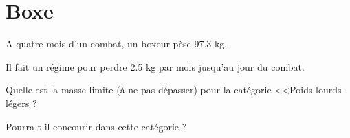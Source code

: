 \section{Boxe}

A quatre mois d'un combat, un boxeur pèse \num{97.3} kg.

Il fait un régime pour perdre \num{2.5} kg par mois jusqu'au jour du combat.

\begin{questions}
	\question Quelle est la masse limite (à ne pas dépasser) pour la catégorie <<Poids lourds-légers ?
	
	\question Pourra-t-il concourir dans cette catégorie ?
\end{questions}